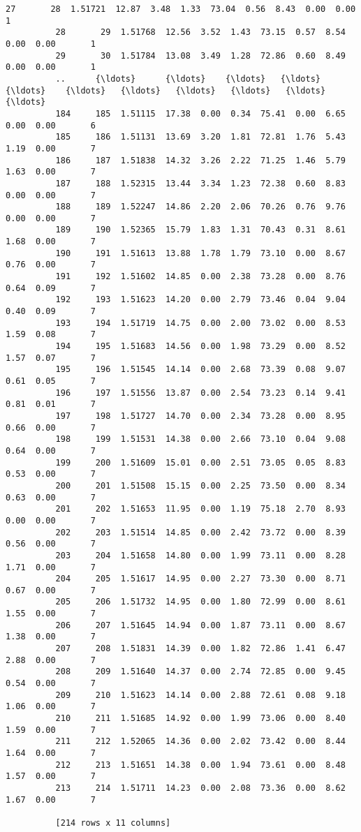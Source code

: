\documentclass[11pt]{article}
\begin{document}
\begin{Verbatim}[commandchars=\\\{\}]
          27       28  1.51721  12.87  3.48  1.33  73.04  0.56  8.43  0.00  0.00       1
          28       29  1.51768  12.56  3.52  1.43  73.15  0.57  8.54  0.00  0.00       1
          29       30  1.51784  13.08  3.49  1.28  72.86  0.60  8.49  0.00  0.00       1
          ..      {\ldots}      {\ldots}    {\ldots}   {\ldots}   {\ldots}    {\ldots}   {\ldots}   {\ldots}   {\ldots}   {\ldots}     {\ldots}
          184     185  1.51115  17.38  0.00  0.34  75.41  0.00  6.65  0.00  0.00       6
          185     186  1.51131  13.69  3.20  1.81  72.81  1.76  5.43  1.19  0.00       7
          186     187  1.51838  14.32  3.26  2.22  71.25  1.46  5.79  1.63  0.00       7
          187     188  1.52315  13.44  3.34  1.23  72.38  0.60  8.83  0.00  0.00       7
          188     189  1.52247  14.86  2.20  2.06  70.26  0.76  9.76  0.00  0.00       7
          189     190  1.52365  15.79  1.83  1.31  70.43  0.31  8.61  1.68  0.00       7
          190     191  1.51613  13.88  1.78  1.79  73.10  0.00  8.67  0.76  0.00       7
          191     192  1.51602  14.85  0.00  2.38  73.28  0.00  8.76  0.64  0.09       7
          192     193  1.51623  14.20  0.00  2.79  73.46  0.04  9.04  0.40  0.09       7
          193     194  1.51719  14.75  0.00  2.00  73.02  0.00  8.53  1.59  0.08       7
          194     195  1.51683  14.56  0.00  1.98  73.29  0.00  8.52  1.57  0.07       7
          195     196  1.51545  14.14  0.00  2.68  73.39  0.08  9.07  0.61  0.05       7
          196     197  1.51556  13.87  0.00  2.54  73.23  0.14  9.41  0.81  0.01       7
          197     198  1.51727  14.70  0.00  2.34  73.28  0.00  8.95  0.66  0.00       7
          198     199  1.51531  14.38  0.00  2.66  73.10  0.04  9.08  0.64  0.00       7
          199     200  1.51609  15.01  0.00  2.51  73.05  0.05  8.83  0.53  0.00       7
          200     201  1.51508  15.15  0.00  2.25  73.50  0.00  8.34  0.63  0.00       7
          201     202  1.51653  11.95  0.00  1.19  75.18  2.70  8.93  0.00  0.00       7
          202     203  1.51514  14.85  0.00  2.42  73.72  0.00  8.39  0.56  0.00       7
          203     204  1.51658  14.80  0.00  1.99  73.11  0.00  8.28  1.71  0.00       7
          204     205  1.51617  14.95  0.00  2.27  73.30  0.00  8.71  0.67  0.00       7
          205     206  1.51732  14.95  0.00  1.80  72.99  0.00  8.61  1.55  0.00       7
          206     207  1.51645  14.94  0.00  1.87  73.11  0.00  8.67  1.38  0.00       7
          207     208  1.51831  14.39  0.00  1.82  72.86  1.41  6.47  2.88  0.00       7
          208     209  1.51640  14.37  0.00  2.74  72.85  0.00  9.45  0.54  0.00       7
          209     210  1.51623  14.14  0.00  2.88  72.61  0.08  9.18  1.06  0.00       7
          210     211  1.51685  14.92  0.00  1.99  73.06  0.00  8.40  1.59  0.00       7
          211     212  1.52065  14.36  0.00  2.02  73.42  0.00  8.44  1.64  0.00       7
          212     213  1.51651  14.38  0.00  1.94  73.61  0.00  8.48  1.57  0.00       7
          213     214  1.51711  14.23  0.00  2.08  73.36  0.00  8.62  1.67  0.00       7
          
          [214 rows x 11 columns]
\end{Verbatim}
            
\end{document}
